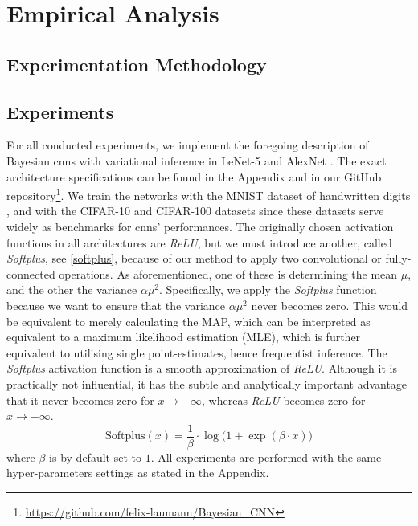 \chapter{Empirical Analysis}

\section{Experimentation Methodology}

\section{Experiments} \label{experiments}
For all conducted experiments, we implement the foregoing description of Bayesian \acp{cnn} with variational inference in LeNet-5 \cite{lecun1998gradient} and AlexNet \cite{krizhevsky2012imagenet}. The exact architecture specifications can be found in the Appendix and in our GitHub repository\footnote{\url{https://github.com/felix-laumann/Bayesian_CNN}}.
We train the networks with the MNIST dataset of handwritten digits \cite{lecun1998gradient}, and with the CIFAR-10 and CIFAR-100 datasets \cite{krizhevsky2009learning} since these datasets serve widely as benchmarks for \acp{cnn}' performances. The originally chosen activation functions in all architectures are \textit{ReLU}, but we must introduce another, called \textit{Softplus}, see \eqref{softplus}, because of our method to apply two convolutional or fully-connected operations. As aforementioned, one of these is determining the mean $\mu$, and the other the variance $\alpha \mu^2$. Specifically, we apply the \textit{Softplus} function because we want to ensure that the variance $\alpha \mu^2$ never becomes zero. This would be equivalent to merely calculating the MAP, which can be interpreted as equivalent to a maximum likelihood estimation (MLE), which is further equivalent to utilising single point-estimates, hence frequentist inference. The \textit{Softplus} activation function is a smooth approximation of \textit{ReLU}. Although it is practically not influential, it has the subtle and analytically important advantage that it never becomes zero for $x \rightarrow -\infty$, whereas \textit{ReLU} becomes zero for $x \rightarrow -\infty$.
\begin{equation}\label{softplus}
     \text{Softplus}(x) = \frac{1}{\beta} \cdot \log \big ( 1 + \exp(\beta \cdot x) \big )
\end{equation}
where $\beta$ is by default set to $1$.
\newline All experiments are performed with the same hyper-parameters settings as stated in the Appendix.

